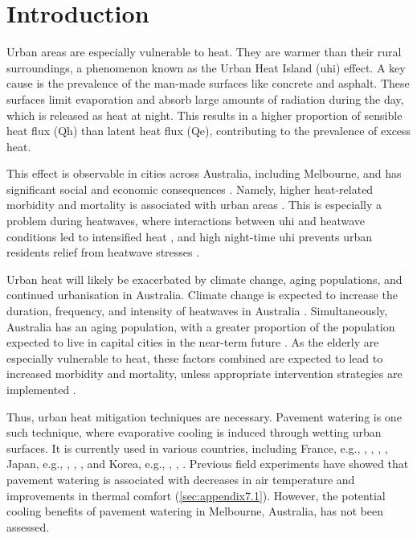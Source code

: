 \documentclass[final,3p,times,authoryear]{elsarticle}
\begin{document}
\maketitle

\section{Introduction}\label{sec:introduction}

Urban areas are especially vulnerable to heat. They are warmer than their rural surroundings, a phenomenon known as the Urban Heat Island (\gls{uhi}) effect. A key cause is the prevalence of the man-made surfaces like concrete and asphalt. These surfaces limit evaporation and absorb large amounts of radiation during the day, which is released as heat at night. This results in a higher proportion of sensible heat flux (\gls{Qh}) than latent heat flux (\gls{Qe}), contributing to the prevalence of excess heat.

This effect is observable in cities across Australia, including Melbourne, and has significant social and economic consequences \citep{Coutts2010}. Namely, higher heat-related morbidity and mortality is associated with urban areas \citep{Heidari2020}. This is especially a problem during heatwaves, where interactions between \gls{uhi} and heatwave conditions led to intensified heat \citep{Li2013a}, and high night-time \gls{uhi} prevents urban residents relief from heatwave stresses \citep{Clarke1972}.

Urban heat will likely be exacerbated by climate change, aging populations, and continued urbanisation in Australia. Climate change is expected to increase the duration, frequency, and intensity of heatwaves in Australia \citep{Cowan2014}. Simultaneously, Australia has an aging population, with a greater proportion of the population expected to live in capital cities in the near-term future \citep{ABS2008}. As the elderly are especially vulnerable to heat, these factors combined are expected to lead to increased morbidity and mortality, unless appropriate intervention strategies are implemented \citep{Wilson2011a}.

Thus, urban heat mitigation techniques are necessary. Pavement watering is one such technique, where evaporative cooling is induced through wetting urban surfaces. It is currently used in various countries, including France, e.g., \cite{Hendel2015a}, \cite{Hendel2015b}, \cite{Hendel2016}, \cite{Parison2020}, Japan, e.g., \cite{Kinouchi1997}, \cite{Himeno2010}, \cite{Takebayashi2021}, and Korea, e.g., \cite{Kim2014a}, \cite{Kim2015}, \cite{Na2021}. Previous field experiments have showed that pavement watering is associated with decreases in air temperature and improvements in thermal comfort (\ref{sec:appendix7.1}). However, the potential cooling benefits of pavement watering in Melbourne, Australia, has not been assessed.
\end{document}
